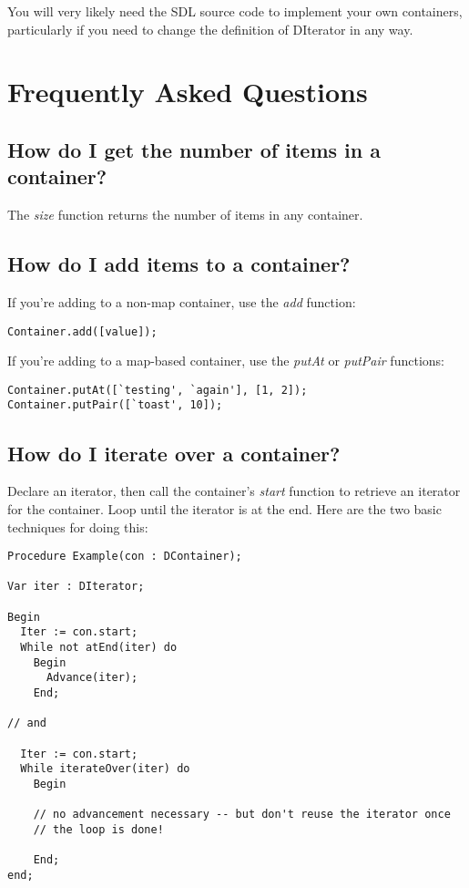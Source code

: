 \documentclass{report}
\begin{document}
You will very likely need the SDL source code to implement your own
containers, particularly if you need to change the definition of DIterator
in any way.

\section{Frequently Asked Questions}

\subsection{How do I get the number of items in a container?}

The \emph{size} function returns the number of items in any container.

\subsection{How do I add items to a container?}

If you're adding to a non-map container, use the \emph{add } function:

\lstinline$Container.add([value]);$

If you're adding to a map-based container, use the \emph{putAt}
or \emph{putPair} functions:

\begin{lstlisting}
Container.putAt([`testing', `again'], [1, 2]);
Container.putPair([`toast', 10]);
\end{lstlisting}

\subsection{How do I iterate over a container?}

Declare an iterator, then call the container's \emph{start} function to
retrieve an iterator for the container. Loop until the iterator is at the
end. Here are the two basic techniques for doing this:

\begin{lstlisting}
Procedure Example(con : DContainer);

Var iter : DIterator;

Begin
  Iter := con.start;
  While not atEnd(iter) do
    Begin
      Advance(iter);
    End;

// and

  Iter := con.start;
  While iterateOver(iter) do
    Begin

    // no advancement necessary -- but don't reuse the iterator once 
    // the loop is done!

    End;
end;
\end{lstlisting}
\end{document}
